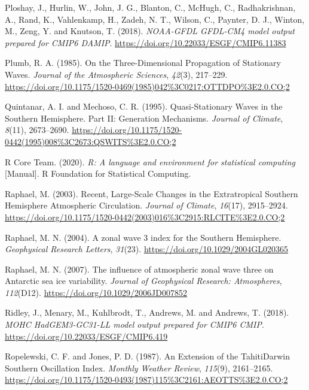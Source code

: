 \documentclass[12pt,oneside,a4paper]{reedthesis}
\newlength{\cslhangindent}
\newenvironment{CSLReferences}[2] %
 {%
  \setlength{\parindent}{0pt}
  \ifodd #1 \everypar{\setlength{\hangindent}{\cslhangindent}}\ignorespaces\fi
  \ifnum #2 > 0
  \setlength{\parskip}{#2\baselineskip}
  \fi
 }%
 {}
\begin{document}
\begin{CSLReferences}{1}{0}
\leavevmode{}%
Ploshay, J., Hurlin, W., John, J. G., Blanton, C., McHugh, C., Radhakrishnan, A., Rand, K., Vahlenkamp, H., Zadeh, N. T., Wilson, C., Paynter, D. J., Winton, M., Zeng, Y. and Knutson, T. (2018). \emph{NOAA-GFDL GFDL-CM4 model output prepared for CMIP6 DAMIP}. \url{https://doi.org/10.22033/ESGF/CMIP6.11383}

\leavevmode{}%
Plumb, R. A. (1985). On the {Three-Dimensional Propagation} of {Stationary Waves}. \emph{Journal of the Atmospheric Sciences}, \emph{42}(3), 217--229. \url{https://doi.org/10.1175/1520-0469(1985)042\%3C0217:OTTDPO\%3E2.0.CO;2}

\leavevmode{}%
Quintanar, A. I. and Mechoso, C. R. (1995). Quasi-{Stationary Waves} in the {Southern Hemisphere}. {Part II}: {Generation Mechanisms}. \emph{Journal of Climate}, \emph{8}(11), 2673--2690. \url{https://doi.org/10.1175/1520-0442(1995)008\%3C2673:QSWITS\%3E2.0.CO;2}

\leavevmode{}%
R Core Team. (2020). \emph{R: {A} language and environment for statistical computing} {[}Manual{]}. {R Foundation for Statistical Computing}.

\leavevmode{}%
Raphael, M. (2003). Recent, {Large-Scale Changes} in the {Extratropical Southern Hemisphere Atmospheric Circulation}. \emph{Journal of Climate}, \emph{16}(17), 2915--2924. \url{https://doi.org/10.1175/1520-0442(2003)016\%3C2915:RLCITE\%3E2.0.CO;2}

\leavevmode{}%
Raphael, M. N. (2004). A zonal wave 3 index for the {Southern Hemisphere}. \emph{Geophysical Research Letters}, \emph{31}(23). \url{https://doi.org/10.1029/2004GL020365}

\leavevmode{}%
Raphael, M. N. (2007). The influence of atmospheric zonal wave three on {Antarctic} sea ice variability. \emph{Journal of Geophysical Research: Atmospheres}, \emph{112}(D12). \url{https://doi.org/10.1029/2006JD007852}

\leavevmode{}%
Ridley, J., Menary, M., Kuhlbrodt, T., Andrews, M. and Andrews, T. (2018). \emph{MOHC HadGEM3-GC31-LL model output prepared for CMIP6 CMIP}. \url{https://doi.org/10.22033/ESGF/CMIP6.419}

\leavevmode{}%
Ropelewski, C. F. and Jones, P. D. (1987). An {Extension} of the {Tahiti}{\textendash}{Darwin Southern Oscillation Index}. \emph{Monthly Weather Review}, \emph{115}(9), 2161--2165. \url{https://doi.org/10.1175/1520-0493(1987)115\%3C2161:AEOTTS\%3E2.0.CO;2}


\end{CSLReferences}
\end{document}
